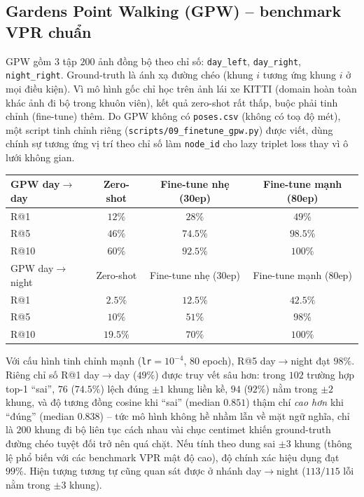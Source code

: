 \documentclass[a4paper,12pt]{article}
\begin{document}
\subsection{Gardens Point Walking (GPW) -- benchmark VPR chuẩn}
GPW gồm 3 tập $200$ ảnh đồng bộ theo chỉ số: \texttt{day\_left}, \texttt{day\_right}, \texttt{night\_right}. Ground-truth là ánh xạ đường chéo (khung $i$ tương ứng khung $i$ ở mọi điều kiện). Vì mô hình gốc chỉ học trên ảnh lái xe KITTI (domain hoàn toàn khác ảnh đi bộ trong khuôn viên), kết quả zero-shot rất thấp, buộc phải tinh chỉnh (fine-tune) thêm. Do GPW không có \texttt{poses.csv} (không có toạ độ mét), một script tinh chỉnh riêng (\texttt{scripts/09\_finetune\_gpw.py}) được viết, dùng chính sự tương ứng vị trí theo chỉ số làm \texttt{node\_id} cho lazy triplet loss thay vì ô lưới không gian.
\begin{center}
\begin{tabular}{lccc}
\toprule
GPW day$\to$day & Zero-shot & Fine-tune nhẹ (30ep) & Fine-tune mạnh (80ep) \\
\midrule
R@1 & $12\%$ & $28\%$ & $49\%$ \\
R@5 & $46\%$ & $74.5\%$ & $98.5\%$ \\
R@10 & $60\%$ & $92.5\%$ & $100\%$ \\
\midrule
GPW day$\to$night & Zero-shot & Fine-tune nhẹ (30ep) & Fine-tune mạnh (80ep) \\
\midrule
R@1 & $2.5\%$ & $12.5\%$ & $42.5\%$ \\
R@5 & $10\%$ & $51\%$ & $98\%$ \\
R@10 & $19.5\%$ & $70\%$ & $100\%$ \\
\bottomrule
\end{tabular}
\end{center}
Với cấu hình tinh chỉnh mạnh (\texttt{lr}$=10^{-4}$, 80 epoch), R@5 day$\to$night đạt $98\%$. Riêng chỉ số R@1 day$\to$day ($49\%$) được truy vết sâu hơn: trong $102$ trường hợp top-1 ``sai'', $76$ ($74.5\%$) lệch đúng $\pm1$ khung liền kề, $94$ ($92\%$) nằm trong $\pm2$ khung, và độ tương đồng cosine khi ``sai'' (median $0.851$) thậm chí \emph{cao hơn} khi ``đúng'' (median $0.838$) -- tức mô hình không hề nhầm lẫn về mặt ngữ nghĩa, chỉ là $200$ khung đi bộ liên tục cách nhau vài chục centimet khiến ground-truth đường chéo tuyệt đối trở nên quá chặt. Nếu tính theo dung sai $\pm3$ khung (thông lệ phổ biến với các benchmark VPR mật độ cao), độ chính xác hiệu dụng đạt $99\%$. Hiện tượng tương tự cũng quan sát được ở nhánh day$\to$night ($113/115$ lỗi nằm trong $\pm3$ khung).
\end{document}
